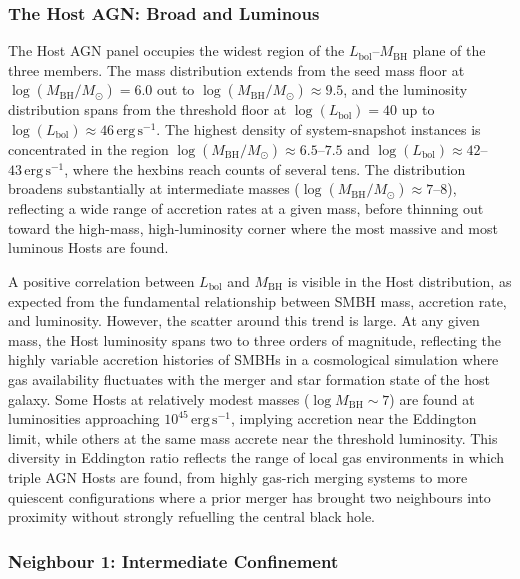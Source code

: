 \documentclass[twocolumn, 10pt]{article}
\begin{document}
\subsubsection{The Host AGN: Broad and Luminous}
\label{subsubsec:hexbin_host}
 
The Host AGN panel occupies the widest region of the $L_\mathrm{bol}$--$M_\mathrm{BH}$ plane of the three members. The mass distribution extends from the seed mass floor at $\log(M_\mathrm{BH}/M_\odot) = 6.0$ out to $\log(M_\mathrm{BH}/M_\odot) \approx 9.5$, and the luminosity distribution spans from the threshold floor at $\log(L_\mathrm{bol}) = 40$ up to $\log(L_\mathrm{bol}) \approx 46\,\mathrm{erg\,s^{-1}}$. The highest density of system-snapshot instances is concentrated in the region $\log(M_\mathrm{BH}/M_\odot) \approx 6.5$--$7.5$ and $\log(L_\mathrm{bol}) \approx 42$--$43\,\mathrm{erg\,s^{-1}}$, where the hexbins reach counts of several tens. The distribution broadens substantially at intermediate masses ($\log(M_\mathrm{BH}/M_\odot) \approx 7$--$8$), reflecting a wide range of accretion rates at a given mass, before thinning out toward the high-mass, high-luminosity corner where the most massive and most luminous Hosts are found.
 
A positive correlation between $L_\mathrm{bol}$ and $M_\mathrm{BH}$ is visible in the Host distribution, as expected from the fundamental relationship between SMBH mass, accretion rate, and luminosity. However, the scatter around this trend is large. At any given mass, the Host luminosity spans two to three orders of magnitude, reflecting the highly variable accretion histories of SMBHs in a cosmological simulation where gas availability fluctuates with the merger and star formation state of the host galaxy. Some Hosts at relatively modest masses ($\log M_\mathrm{BH} \sim 7$) are found at luminosities approaching $10^{45}\,\mathrm{erg\,s^{-1}}$, implying accretion near the Eddington limit, while others at the same mass accrete near the threshold luminosity. This diversity in Eddington ratio reflects the range of local gas environments in which triple AGN Hosts are found, from highly gas-rich merging systems to more quiescent configurations where a prior merger has brought two neighbours into proximity without strongly refuelling the central black hole.
 
\subsubsection{Neighbour 1: Intermediate Confinement}
\label{subsubsec:hexbin_n1}
 
\end{document}
